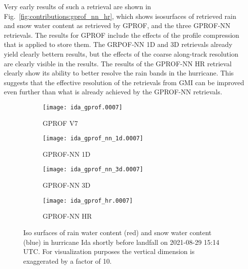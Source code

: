 Very early results of such a retrieval are shown in
Fig.~\ref{fig:contributions:gprof_nn_hr}, which shows isosurfaces of retrieved
rain and snow water content as retrieved by GPROF, and the three GPROF-NN
retrievals. The results for GPROF include the effects of the profile compression
that is applied to store them. The GRPOF-NN 1D and 3D retrievals already yield
clearly bettern results, but the effects of the coarse along-track resolution
are clearly visible in the results. The results of the GPROF-NN HR retrieval
clearly show its ability to better resolve the rain bands in the hurricane. This
suggests that the effective resolution of the retrievals from GMI can be
improved even further than what is already achieved by the GPROF-NN retrievals.


\begin{figure}
  \centering
  \begin{subfigure}[b]{0.49\textwidth}
    \centering
    \texttt{[image: ida\_gprof.0007]}
    \caption{GPROF V7}
  \end{subfigure}
  \hfill
  \begin{subfigure}[b]{0.49\textwidth}
    \centering
    \texttt{[image: ida\_gprof\_nn\_1d.0007]}
    \caption{GPROF-NN 1D}
  \end{subfigure}
  \begin{subfigure}[b]{0.49\textwidth}
    \centering
    \texttt{[image: ida\_gprof\_nn\_3d.0007]}
    \caption{GPROF-NN 3D}
  \end{subfigure}
  \hfill
  \begin{subfigure}[b]{0.49\textwidth}
    \centering
    \texttt{[image: ida\_gprof\_hr.0007]}
    \caption{GPROF-NN HR}
  \end{subfigure}
  \caption{
    Iso surfaces of rain water content (red) and snow water content (blue) in hurricane Ida
    shortly before landfall on 2021-08-29 15:14 UTC. For visualization purposes the
    vertical dimension is exaggerated by a factor of 10.
  }
\end{figure}


